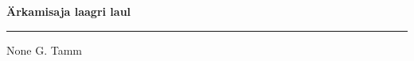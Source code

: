 \documentclass[10pt]{book}
\begin{document}
{
  \samepage
  \raggedbottom
  \raggedright
  \sloppy


  \vspace{0.2in}

  \noindent\begin{minipage}{.1\textwidth}
    \hfill\vspace{0.1in}
  \end{minipage}%
  \noindent\begin{minipage}{.8\textwidth}
    \centering
    \bfseries
    \large \"Arkamisaja laagri laul
  \end{minipage}%
  \noindent\begin{minipage}{.1\textwidth}
      \hfill\vspace{0.1in}
  \end{minipage}

  \nopagebreak[4]
  \vspace{0.1in}
  \nopagebreak[4]
  \hrule height 0.05ex
  \nopagebreak[4]
  \vspace{-0.05in}

  {\footnotesize None \hfill G. Tamm }\\
  \vspace{0.01in}



}
\end{document}

